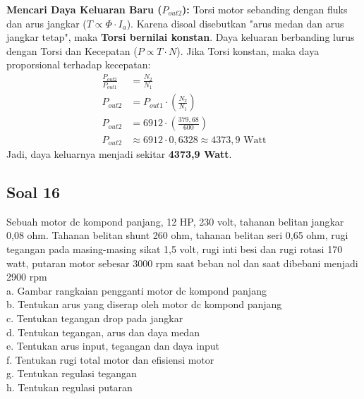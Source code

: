\documentclass[12pt, a4paper]{article}
\begin{document}
\begin{enumerate}[label=\alph*.]
    \textbf{Mencari Daya Keluaran Baru ($P_{out2}$):}
    Torsi motor sebanding dengan fluks dan arus jangkar ($T \propto \Phi \cdot I_a$). Karena disoal disebutkan "arus medan dan arus jangkar tetap", maka \textbf{Torsi bernilai konstan}.
    Daya keluaran berbanding lurus dengan Torsi dan Kecepatan ($P \propto T \cdot N$). Jika Torsi konstan, maka daya proporsional terhadap kecepatan:
    \begin{align*}
        \frac{P_{out2}}{P_{out1}} &= \frac{N_2}{N_1} \\
        P_{out2} &= P_{out1} \cdot \left(\frac{N_2}{N_1}\right) \\
        P_{out2} &= 6912 \cdot \left(\frac{379,68}{600}\right) \\
        P_{out2} &\approx 6912 \cdot 0,6328 \approx 4373,9 \text{ Watt}
    \end{align*}
    Jadi, daya keluarnya menjadi sekitar \textbf{4373,9 Watt}.
\end{enumerate}

\subsection*{Soal 16}
Sebuah motor dc kompond panjang, 12 HP, 230 volt, tahanan belitan jangkar 0,08 ohm. Tahanan belitan shunt 260 ohm, tahanan belitan seri 0,65 ohm, rugi tegangan pada masing-masing sikat 1,5 volt, rugi inti besi dan rugi rotasi 170 watt, putaran motor sebesar 3000 rpm saat beban nol dan saat dibebani menjadi 2900 rpm\\
a. Gambar rangkaian pengganti motor dc kompond panjang\\
b. Tentukan arus yang diserap oleh motor dc kompond panjang\\
c. Tentukan tegangan drop pada jangkar\\
d. Tentukan tegangan, arus dan daya medan\\
e. Tentukan arus input, tegangan dan daya input\\
f. Tentukan rugi total motor dan efisiensi motor\\
g. Tentukan regulasi tegangan\\
h. Tentukan regulasi putaran
\end{document}
